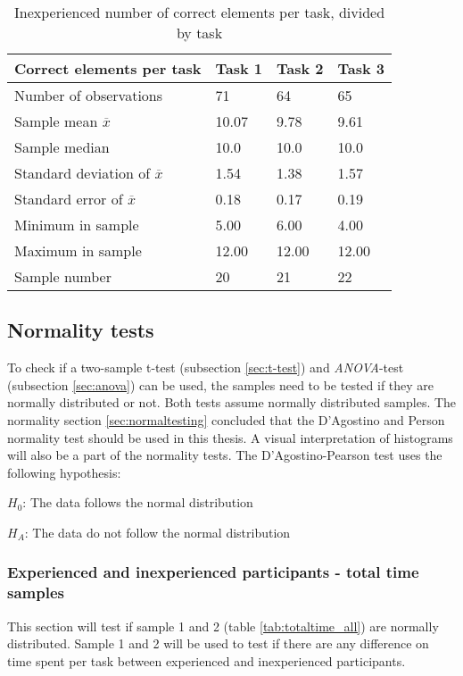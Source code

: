 \begin{table}[H]
	\centering
	\begin{tabular}{l|l|l|l}
		Correct elements per task & Task 1 & Task 2 & Task 3 \\ \hline
		Number of observations & 71 & 64  & 65 \\
		Sample mean $\overline{x}$  & 10.07  &  9.78 &  9.61  \\
		Sample median  & 10.0  & 10.0  &  10.0  \\
		Standard deviation of $\overline{x}$  & 1.54  & 1.38  & 1.57   \\
		Standard error of $\overline{x}$  & 0.18 & 0.17 & 0.19  \\
		Minimum in sample  & 5.00 & 6.00 &  4.00  \\
		Maximum in sample  & 12.00 & 12.00  & 12.00 \\ \hline
		Sample number & 20 & 21 & 22 \\ \hline
	\end{tabular}
	\caption[Correct elements, inexperienced per task]{Inexperienced number of correct elements per task, divided by task}
	\label{tab:totalcorrect_tasks_inexperienced}
\end{table}

\subsection{Normality tests}\label{sec:normality_results}
To check if a two-sample t-test (subsection \ref{sec:t-test}) and \textit{ANOVA}-test (subsection \ref{sec:anova}) can be used, the samples need to be tested if they are normally distributed or not. Both tests assume normally distributed samples. The normality section \ref{sec:normaltesting} concluded that the D'Agostino and Person normality test should be used in this thesis. A visual interpretation of histograms will also be a part of the normality tests. The D'Agostino-Pearson test uses the following hypothesis:\newline

\centerline{$H_{0}$: The data follows the normal distribution} 
\centerline{$H_{A}$: The data do not follow the normal distribution}


\subsubsection[Sample 1 and 2]{Experienced and inexperienced participants - total time samples}\label{sec:totaltime_ex_inex}
This section will test if sample 1 and 2 (table \ref{tab:totaltime_all}) are normally distributed. Sample 1 and 2 will be used to test if there are any difference on time spent per task between experienced and inexperienced participants. 

